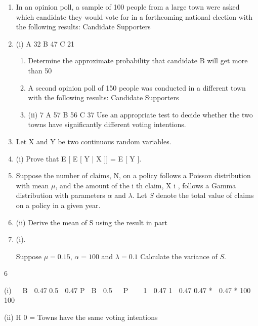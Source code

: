 \documentclass[a4paper,12pt]{article}
\begin{document}
\begin{enumerate}
\item In an opinion poll, a sample of 100 people from a large town were asked which
candidate they would vote for in a forthcoming national election with the following
results:
Candidate
Supporters
\item (i)
A
32
B
47
C
21
\begin{enumerate}[\item (i)]
\item Determine the approximate probability that candidate B will get more than
50%

\item A second opinion poll of 150 people was conducted in a different town with the
following results:
Candidate
Supporters
\item (ii)
7
A
57
B
56
C
37
Use an appropriate test to decide whether the two towns have significantly
different voting intentions.
\end{enumerate}

\item Let X and Y be two continuous random variables.
\item (i)
Prove that E [ E [ Y | X ]] = E [ Y ].

\item Suppose the number of claims, N, on a policy follows a Poisson distribution with mean $\mu$, and the amount of the i th claim, X i , follows a Gamma distribution with
parameters $\alpha$ and $\lambda$. Let $S$ denote the total value of claims on a policy in a given year.
\item (ii)
Derive the mean of S using the result in part \item (i).

Suppose $\mu = 0.15$, $\alpha=100$ and $\lambda =0.1$ 
Calculate the variance of $S$.
\end{enumerate}
\newpage
6
\item (i) 

B  0.47
0.5  0.47
P  B  0.5   P 


1  0.47
1  0.47
0.47 *
 0.47 *
100
100

\item (ii) H 0 = Towns have the same voting intentions
\end{document}
